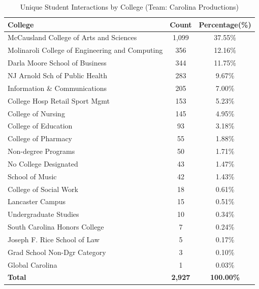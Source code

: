 \documentclass[
  letterpaper,
  DIV=11,
  numbers=noendperiod]{scrartcl}
\begin{document}
\begin{longtable}[t]{lcc}
\caption{\label{tab:CollegeTabCP}Unique Student Interactions by College (Team: Carolina Productions)}\\
\toprule
\textbf{College} & \textbf{Count} & \textbf{Percentage(\%)}\\
\midrule
McCausland College of Arts and Sciences & 1,099 & 37.55\%\\
Molinaroli College of Engineering and Computing & 356 & 12.16\%\\
Darla Moore School of Business & 344 & 11.75\%\\
NJ Arnold Sch of Public Health & 283 & 9.67\%\\
Information \& Communications & 205 & 7.00\%\\
\addlinespace
College Hosp Retail Sport Mgmt & 153 & 5.23\%\\
College of Nursing & 145 & 4.95\%\\
College of Education & 93 & 3.18\%\\
College of Pharmacy & 55 & 1.88\%\\
Non-degree Programs & 50 & 1.71\%\\
\addlinespace
No College Designated & 43 & 1.47\%\\
School of Music & 42 & 1.43\%\\
College of Social Work & 18 & 0.61\%\\
Lancaster Campus & 15 & 0.51\%\\
Undergraduate Studies & 10 & 0.34\%\\
\addlinespace
South Carolina Honors College & 7 & 0.24\%\\
Joseph F. Rice School of Law & 5 & 0.17\%\\
Grad School Non-Dgr Category & 3 & 0.10\%\\
Global Carolina & 1 & 0.03\%\\
\midrule
\textbf{Total} & \textbf{2,927} & \textbf{100.00\%}\\
\bottomrule
\end{longtable}
\endgroup{}
\end{document}
